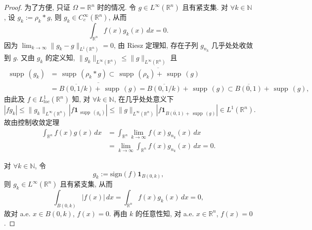 \documentclass[a4paper,11pt]{article}
\theoremstyle{definition}
\def \supp {\mathop\mathrm{\,supp\,}}
\begin{document}
\begin{CJK*}{UTF8}{gbsn}
\begin{proof}
    为了方便, 只证 $ \Omega = \mathbb{R}^n $ 时的情况.
    令 $ g \in L^\infty(\mathbb{R}^n) $ 且有紧支集.
    对 $ \forall k \in \mathbb{N} $, 设 $ g_k := \rho_k * g $, 则 $ g_k \in C_c^\infty(\mathbb{R}^n) $,
    从而
    $$
        \int_{\mathbb{R}^n} f(x) g_k(x) \, dx = 0.
    $$
    因为 $ \lim_{k \to \infty} \| g_k - g \|_{L^1(\mathbb{R}^n)} = 0 $, 由 Riesz 定理知, 
    存在子列 $ g_{n_k} $ 几乎处处收敛到 $ g $. 又由 $ g_k $ 的定义知, 
    $ \|g_k\|_{L^\infty(\mathbb{R}^n)} \leq \|g\|_{L^\infty(\mathbb{R}^n)} $ 
    且 
    \begin{align*}
        \supp(g_k) &= \supp(\rho_k * g) 
                   \subset \overline{\supp(\rho_k) + \supp(g)} \\
                   &= \overline{\overline{B(0, 1/k)} + \supp(g)} 
                   = \overline{B(0, 1/k)} + \supp(g)
                   \subset \overline{B(0, 1)} + \supp(g), 
    \end{align*}
    由此及 $ f \in L^1_{loc}(\mathbb{R}^n) $ 知, 
    对 $ \forall k \in \mathbb{N} $, 在几乎处处意义下
    $$
        |f g_k| \leq \|g_k\|_{L^\infty(\mathbb{R}^n)} |f \mathbf{1}_{\supp(g_k)}|
                \leq \|g\|_{L^\infty(\mathbb{R}^n)} \left|f \mathbf{1}_{\overline{B(0, 1)} + \supp(g)}\right| 
                \in L^1(\mathbb{R}^n).
    $$
    故由控制收敛定理
    \begin{align*}
        \int_{\mathbb{R}^n} f(x) g(x) \, dx
            &= \int_{\mathbb{R}^n} \lim_{k \to \infty} f(x) g_{n_k}(x) \, dx \\
            &= \lim_{k \to \infty} \int_{\mathbb{R}^n} f(x) g_{n_k}(x) \, dx = 0.
    \end{align*}
    
    对 $ \forall k \in \mathbb{N} $, 令
    $$
        g_k := \mathrm{sign} (f) \mathbf{1}_{B(0, k)},
    $$
    则 $ g_k \in L^\infty(\mathbb{R}^n) $ 且有紧支集, 从而
    $$
        \int_{B(0, k)} |f(x)| \, dx
            = \int_{\mathbb{R}^n} f(x) g_k(x) \, dx
            = 0,
    $$
    故对 a.e. $ x \in B(0, k) $, $ f(x) = 0 $.
    再由 $ k $ 的任意性知, 对 a.e. $ x \in \mathbb{R}^n $, $ f(x) = 0 $.
\end{proof}

\end{CJK*}
\end{document}
